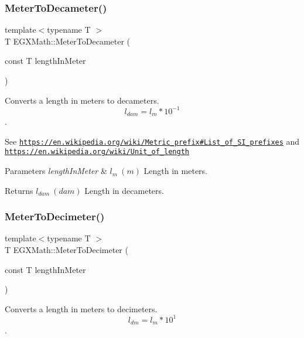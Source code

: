 \subsubsection{\texorpdfstring{Meter\+To\+Decameter()}{MeterToDecameter()}}
{\footnotesize\ttfamily template$<$typename T $>$ \\
T E\+G\+X\+Math\+::\+Meter\+To\+Decameter (\begin{DoxyParamCaption}\item[{const T}]{length\+In\+Meter }\end{DoxyParamCaption})}



Converts a length in meters to decameters. \[ l_{dam}=l_{m} * 10^{-1} \]. 

See \href{https://en.wikipedia.org/wiki/Metric_prefix#List_of_SI_prefixes}{\tt https\+://en.\+wikipedia.\+org/wiki/\+Metric\+\_\+prefix\#\+List\+\_\+of\+\_\+\+S\+I\+\_\+prefixes} and \href{https://en.wikipedia.org/wiki/Unit_of_length}{\tt https\+://en.\+wikipedia.\+org/wiki/\+Unit\+\_\+of\+\_\+length} 
\begin{DoxyParams}{Parameters}
{\em length\+In\+Meter} & $ l_{m}\ (m)$ Length in meters. \\
\hline
\end{DoxyParams}
\begin{DoxyReturn}{Returns}
$ l_{dam}\ (dam)$ Length in decameters. 
\end{DoxyReturn}
\mbox{\label{group___e_g_x_math-_conversions-_length_conversions-_meter-_s_i_ga4caa9cd21d4f78039b1ceddf1f0ea5fd}} 
\subsubsection{\texorpdfstring{Meter\+To\+Decimeter()}{MeterToDecimeter()}}
{\footnotesize\ttfamily template$<$typename T $>$ \\
T E\+G\+X\+Math\+::\+Meter\+To\+Decimeter (\begin{DoxyParamCaption}\item[{const T}]{length\+In\+Meter }\end{DoxyParamCaption})}



Converts a length in meters to decimeters. \[ l_{dm}=l_{m} * 10^{1} \]. 

